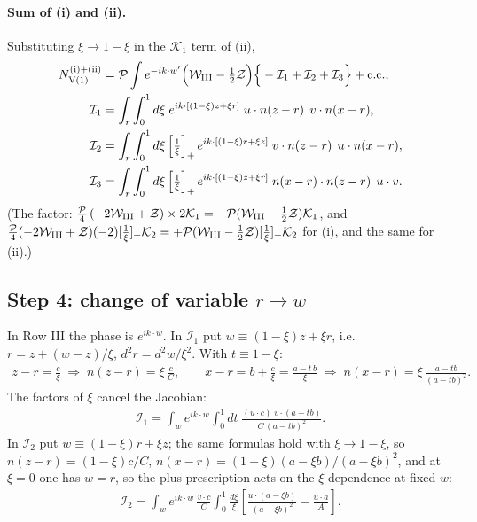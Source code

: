 \documentclass[10pt]{article}
\numberwithin{equation}{section}
\begin{document}
\paragraph{Sum of (i) and (ii).} Substituting $\xi\to1-\xi$ in the $\mathcal{K}_{1}$ term of (ii),
\begin{align}
N_{\rm V(1)}^{\rm (i)+(ii)}&=\mathcal{P}\int e^{-ik\cdot w'}\Big(\mathcal{W}_{\rm III}-\tfrac12\mathcal{Z}\Big)\Big\{-\mathcal{I}_{1}+\mathcal{I}_{2}+\mathcal{I}_{3}\Big\}+{\rm c.c.},\notag\\
\mathcal{I}_{1}&=\int_{r}\int_{0}^{1}d\xi\;e^{ik\cdot[(1-\xi)z+\xi r]}\;u\cdot n(z-r)\;\,v\cdot n(x-r),\notag\\
\mathcal{I}_{2}&=\int_{r}\int_{0}^{1}d\xi\left[\tfrac1\xi\right]_{+}e^{ik\cdot[(1-\xi)r+\xi z]}\;v\cdot n(z-r)\;\,u\cdot n(x-r),\notag\\
\mathcal{I}_{3}&=\int_{r}\int_{0}^{1}d\xi\left[\tfrac1\xi\right]_{+}e^{ik\cdot[(1-\xi)z+\xi r]}\;n(x-r)\cdot n(z-r)\;\,u\cdot v. \label{eq:I123}
\end{align}
(The factor: $\frac{\mathcal{P}}{4}\,(-2\mathcal{W}_{\rm III}+\mathcal{Z})\times2\mathcal{K}_{1}=-\mathcal{P}(\mathcal{W}_{\rm III}-\frac12\mathcal{Z})\mathcal{K}_{1}$, and $\frac{\mathcal{P}}{4}(-2\mathcal{W}_{\rm III}+\mathcal{Z})(-2)[\frac1\xi]_{+}\mathcal{K}_{2}=+\mathcal{P}(\mathcal{W}_{\rm III}-\frac12\mathcal{Z})[\frac1\xi]_{+}\mathcal{K}_{2}$ for (i), and the same for (ii).)

\subsection{Step 4: change of variable $r\to w$}
In Row III the phase is $e^{ik\cdot w}$. In $\mathcal{I}_{1}$ put $w\equiv(1-\xi)z+\xi r$, i.e.\ $r=z+(w-z)/\xi$, $d^{2}r=d^{2}w/\xi^{2}$. With $t\equiv1-\xi$:
\begin{align}
z-r=\frac{c}{\xi}\;\Rightarrow\;n(z-r)=\xi\,\frac{c}{C},\qquad
x-r=b+\frac{c}{\xi}=\frac{a-t\,b}{\xi}\;\Rightarrow\;n(x-r)=\xi\,\frac{a-tb}{(a-tb)^{2}} .
\end{align}
The factors of $\xi$ cancel the Jacobian:
\begin{align}
\mathcal{I}_{1}=\int_{w}e^{ik\cdot w}\int_{0}^{1}dt\;\frac{(u\cdot c)\;v\cdot(a-tb)}{C\,(a-tb)^{2}} .
\end{align}
In $\mathcal{I}_{2}$ put $w\equiv(1-\xi)r+\xi z$; the same formulas hold with $\xi\to1-\xi$, so $n(z-r)=(1-\xi)c/C$, $n(x-r)=(1-\xi)(a-\xi b)/(a-\xi b)^{2}$, and at $\xi=0$ one has $w=r$, so the plus prescription acts on the $\xi$ dependence at fixed $w$:
\begin{align}
\mathcal{I}_{2}=\int_{w}e^{ik\cdot w}\,\frac{v\cdot c}{C}\int_{0}^{1}\frac{d\xi}{\xi}\left[\frac{u\cdot(a-\xi b)}{(a-\xi b)^{2}}-\frac{u\cdot a}{A}\right].
\end{align}
\end{document}
